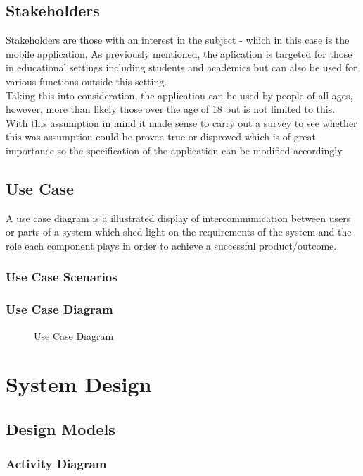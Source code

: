 \documentclass{report}
\begin{document}
	\section{Stakeholders}
	Stakeholders are those with an interest in the subject - which in this case is the mobile application. As previously mentioned, the aplication is targeted for those in educational settings including students and academics but can also be used for various functions outside this setting. \\
	
	Taking this into consideration, the application can be used by people of all ages, however, more than likely those over the age of 18 but is not limited to this. With this assumption in mind it made sense to carry out a survey to see whether this was assumption could be proven true or disproved which is of great importance so the specification of the application can be modified accordingly.
	\section{Use Case}
	A use case diagram is a illustrated display of intercommunication between users or parts of a system which shed light on the requirements of the system and the role each component plays in order to achieve a successful product/outcome.
		\subsection{Use Case Scenarios}
	
		\subsection{Use Case Diagram}
		\begin{figure}[H]
			\begin{center}
			\end{center}
			\caption[Use Case Diagram]{Use Case Diagram}
		\end{figure}
	
\chapter{System Design}
	\section{Design Models}
		\subsection{Activity Diagram}
\end{document}
